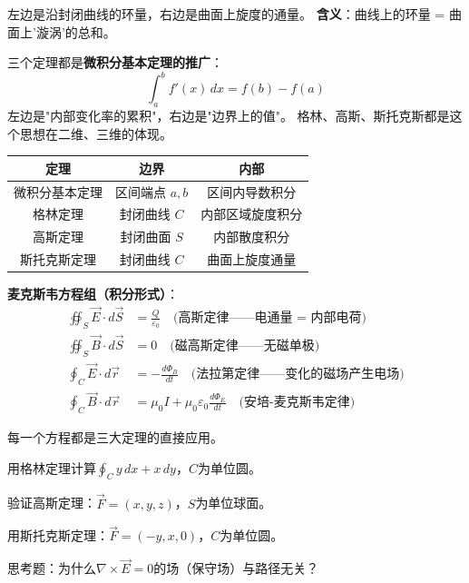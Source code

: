 \documentclass[a4paper,12pt]{ctexart}
\begin{document}
左边是沿封闭曲线的环量，右边是曲面上旋度的通量。
\textbf{含义}：曲线上的环量 = 曲面上'漩涡'的总和。


三个定理都是\textbf{微积分基本定理的推广}：
\[
\int_a^b f'(x)\,dx = f(b)-f(a)
\]
左边是"内部变化率的累积"，右边是"边界上的值"。
格林、高斯、斯托克斯都是这个思想在二维、三维的体现。

\begin{center}
\begin{tabular}{c|c|c}
定理 & 边界 & 内部\\ \hline
微积分基本定理 & 区间端点 $a,b$ & 区间内导数积分\\
格林定理 & 封闭曲线 $C$ & 内部区域旋度积分\\
高斯定理 & 封闭曲面 $S$ & 内部散度积分\\
斯托克斯定理 & 封闭曲线 $C$ & 曲面上旋度通量
\end{tabular}
\end{center}


\textbf{麦克斯韦方程组（积分形式）}：
\begin{align*}
\oiint_S \vec E\cdot d\vec S &= \frac{Q}{\varepsilon_0}\quad\text{(高斯定律——电通量 = 内部电荷)} \\
\oiint_S \vec B\cdot d\vec S &= 0\quad\text{(磁高斯定律——无磁单极)} \\
\oint_C \vec E\cdot d\vec r &= -\frac{d\Phi_B}{dt}\quad\text{(法拉第定律——变化的磁场产生电场)} \\
\oint_C \vec B\cdot d\vec r &= \mu_0 I + \mu_0\varepsilon_0\frac{d\Phi_E}{dt}\quad\text{(安培-麦克斯韦定律)}
\end{align*}

每一个方程都是三大定理的直接应用。


\begin{exercise}
\item 用格林定理计算$\oint_C y\,dx+x\,dy$，$C$为单位圆。
\item 验证高斯定理：$\vec F=(x,y,z)$，$S$为单位球面。
\item 用斯托克斯定理：$\vec F=(-y,x,0)$，$C$为单位圆。
\item 思考题：为什么$\nabla\times\vec E=0$的场（保守场）与路径无关？
\end{exercise}
\end{document}
